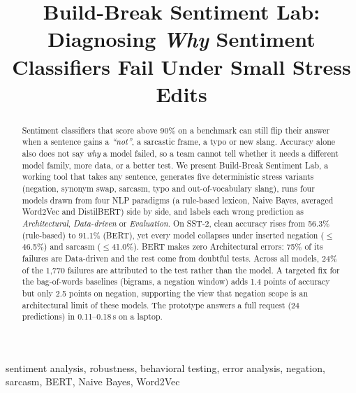 \documentclass[conference]{IEEEtran}
\newcommand{\ex}[1]{\textit{``#1''}}
\begin{document}
\title{Build-Break Sentiment Lab: Diagnosing \emph{Why} Sentiment Classifiers Fail Under Small Stress Edits}

\author{
\and
{}
}

\maketitle

\begin{abstract}
Sentiment classifiers that score above 90\% on a benchmark can still flip their answer when a
sentence gains a \ex{not}, a sarcastic frame, a typo or new slang. Accuracy alone also does not
say \emph{why} a model failed, so a team cannot tell whether it needs a different model family,
more data, or a better test. We present Build-Break Sentiment Lab, a working tool that takes any
sentence, generates five deterministic stress variants (negation, synonym swap, sarcasm, typo and
out-of-vocabulary slang), runs four models drawn from four NLP paradigms (a rule-based lexicon,
Naive Bayes, averaged Word2Vec and DistilBERT) side by side, and labels each wrong prediction as
\emph{Architectural}, \emph{Data-driven} or \emph{Evaluation}. On SST-2, clean accuracy rises from
56.3\% (rule-based) to 91.1\% (BERT), yet every model collapses under inserted negation
($\leq$46.5\%) and sarcasm ($\leq$41.0\%). BERT makes zero Architectural errors: 75\% of its
failures are Data-driven and the rest come from doubtful tests. Across all models, 24\% of the
1{,}770 failures are attributed to the test rather than the model. A targeted fix for the
bag-of-words baselines (bigrams, a negation window) adds 1.4 points of accuracy but only 2.5 points
on negation, supporting the view that negation scope is an architectural limit of these models.
The prototype answers a full request (24 predictions) in 0.11--0.18\,s on a laptop.
\end{abstract}

\begin{IEEEkeywords}
sentiment analysis, robustness, behavioral testing, error analysis, negation, sarcasm, BERT, Naive Bayes, Word2Vec
\end{IEEEkeywords}
\end{document}
